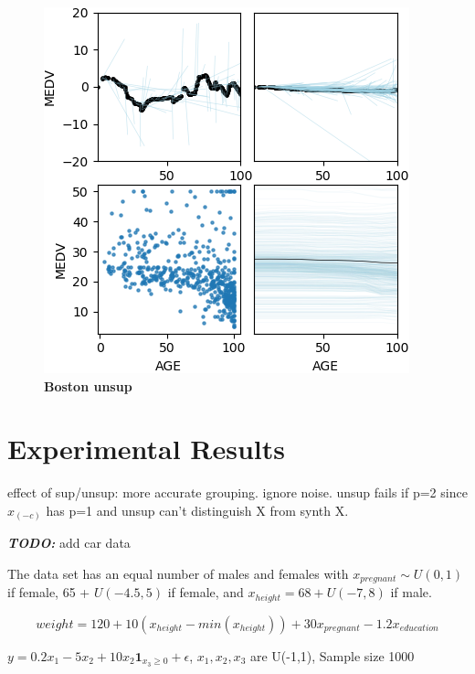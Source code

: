\documentclass[12pt]{article}
\newcommand{\todo}[1]{{\bf\em TODO:} {{#1}}}
\newcommand{\xnc}{$x_{(-c)}$}
\begin{document}
\begin{figure}[htbp]
\begin{center}
\includegraphics[scale=0.7]{images/boston_unsup.png}
\caption{{\bf   Boston unsup}}
\label{fig:boston_unsup}
\end{center}
\end{figure}

\section{Experimental Results}

effect of sup/unsup: more accurate grouping. ignore noise. unsup fails if p=2 since \xnc{} has p=1 and unsup can't distinguish X from synth X.

\todo{add car data}

The data set has an equal number of males and females with $x_{pregnant} \sim U(0,1)$ if female, 65 + $U(-4.5,5)$ if female, and $x_{height} = 68 + U(-7,8)$ if male. 

\[
weight = 120 + 10(x_{height} - min(x_{height})) + 30x_{pregnant} - 1.2x_{education}
\]

$y = 0.2x_1 - 5x_2 + 10x_2\mathbf{1}_{x_3 \geq 0} + \epsilon$, $x_1, x_2, x_3$ are U(-1,1), Sample size 1000
\end{document}
